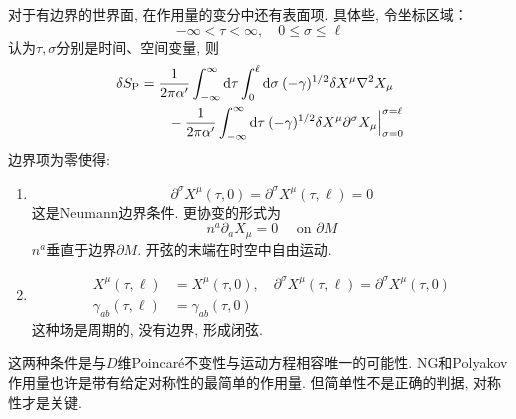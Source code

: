对于有边界的世界面, 在作用量的变分中还有表面项. 具体些, 令坐标区域：
\begin{equation}
-\infty<\tau<\infty, \quad 0 \leq \sigma \leq \ell
\end{equation}
认为$\tau,\sigma$分别是时间、空间变量, 则
\begin{align}
\delta S_{\mathrm{P}}&=\frac{1}{2 \pi \alpha^{\prime}} \int_{-\infty}^{\infty} \mathrm{d}\tau \int_{0}^{\ell} \mathrm{d}\sigma\:(-\gamma)^{1 / 2} \delta X^{\mu} \nabla^{2} X_{\mu} \nonumber  \\
&\qquad -\frac{1}{2 \pi \alpha^{\prime}} \int_{-\infty}^{\infty} \mathrm{d} \tau\: (-\gamma)^{1 / 2} \delta X^{\mu}
 \partial^{\sigma} X_{\mu}\Big\rvert_{\sigma=0}^{\sigma=\ell}
\end{align}
边界项为零使得:
\begin{enumerate}
    \item \begin{equation}
        \partial^{\sigma} X^{\mu}(\tau, 0)=\partial^{\sigma} X^{\mu}(\tau, \ell)=0 \label{Neumann-bound}
        \end{equation}
        这是Neumann边界条件. 更协变的形式为
        \begin{equation}
        n^{a} \partial_{a} X_{\mu}=0 \quad \text { on } \partial M
        \end{equation}
        $n^a$垂直于边界$\partial M$. 开弦的末端在时空中自由运动. 
     \item   
     \begin{subequations}
     \begin{align}
     X^{\mu}(\tau, \ell)&=X^{\mu}(\tau, 0), \quad \partial^{\sigma} X^{\mu}(\tau, \ell)=\partial^{\sigma} X^{\mu}(\tau, 0)\\
     \gamma_{a b}(\tau, \ell)&=\gamma_{a b}(\tau, 0)
     \end{align}
     \end{subequations}
     这种场是周期的, 没有边界, 形成闭弦. 
\end{enumerate}

这两种条件是与$D$维Poincar\'{e}不变性与运动方程相容唯一的可能性. NG和Polyakov作用量也许是带有给定对称性的最简单的作用量. 但简单性不是正确的判据, 对称性才是关键. 

